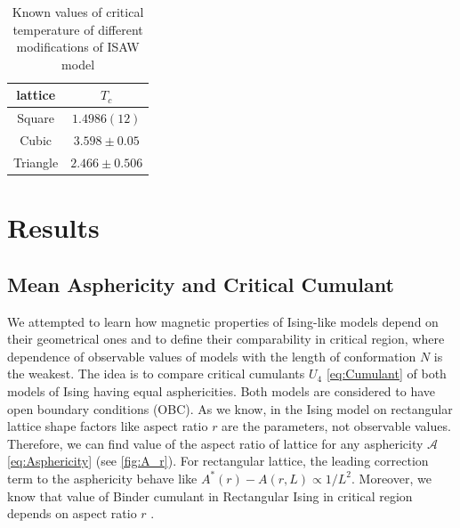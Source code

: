 \documentclass[a4paper]{jpconf}
\begin{document}
\begin{table}[h]
    \centering
    \begin{tabular}{|c|c|}
        \hline
        lattice & $T_{c}$ \\ \hline
        Square & $1.4986(12)$ \cite{Caracciolo2011} \\ \hline
        Cubic & $3.598 \pm 0.05 $\cite{Tesi1996} \\ \hline
        Triangle & $2.466 \pm 0.506 $\cite{Privman1986} \\ \hline
    \end{tabular}
    \caption{Known values of critical temperature of different modifications of ISAW model}
    \label{tab:ISAW_T_c}
\end{table}



\section{Results}

\subsection{Mean Asphericity and Critical Cumulant}


We attempted to learn how magnetic properties of Ising-like models depend on their geometrical ones and to define their comparability in critical region, where dependence of observable values of models with the length of conformation $N$ is the weakest. The idea is to compare critical cumulants $U_{4}$ \eqref{eq:Cumulant} of both models of Ising having equal asphericities. Both models are considered to have open boundary conditions (OBC). As we know, in the Ising model on rectangular lattice shape factors like aspect ratio $r$ are the parameters, not observable values. Therefore, we can find value of the aspect ratio of lattice for any asphericity $\mathcal{A}$ \eqref{eq:Asphericity} (see \cref{fig:A_r}). For rectangular lattice, the leading correction term to the asphericity behave like $A^{*}(r) - A(r, L) \propto 1 / L^{2}$. Moreover, we know that value of Binder cumulant in Rectangular Ising in critical region depends on aspect ratio $r$ \cite{Selke2006}. 
\end{document}
